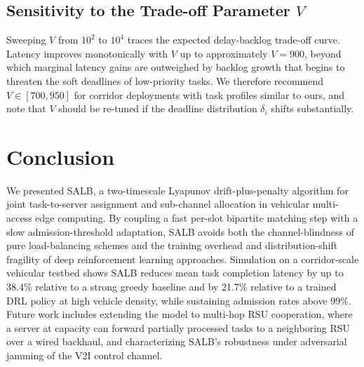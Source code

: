 \documentclass[journal,10pt]{IEEEtran}
\begin{document}
\subsection{Sensitivity to the Trade-off Parameter $V$}
Sweeping $V$ from $10^2$ to $10^4$ traces the expected delay-backlog trade-off curve. Latency improves monotonically with $V$ up to approximately $V = 900$, beyond which marginal latency gains are outweighed by backlog growth that begins to threaten the soft deadlines of low-priority tasks. We therefore recommend $V \in [700, 950]$ for corridor deployments with task profiles similar to ours, and note that $V$ should be re-tuned if the deadline distribution $\delta_i$ shifts substantially.

\section{Conclusion}
\label{sec:conclusion}
We presented SALB, a two-timescale Lyapunov drift-plus-penalty algorithm for joint task-to-server assignment and sub-channel allocation in vehicular multi-access edge computing. By coupling a fast per-slot bipartite matching step with a slow admission-threshold adaptation, SALB avoids both the channel-blindness of pure load-balancing schemes and the training overhead and distribution-shift fragility of deep reinforcement learning approaches. Simulation on a corridor-scale vehicular testbed shows SALB reduces mean task completion latency by up to 38.4\% relative to a strong greedy baseline and by 21.7\% relative to a trained DRL policy at high vehicle density, while sustaining admission rates above 99\%. Future work includes extending the model to multi-hop RSU cooperation, where a server at capacity can forward partially processed tasks to a neighboring RSU over a wired backhaul, and characterizing SALB's robustness under adversarial jamming of the V2I control channel.
\end{document}
